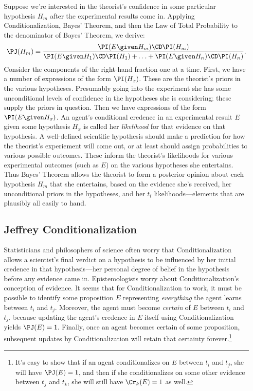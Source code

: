 Suppose we're interested in the theorist's confidence in some particular hypothesis $H_m$ after the experimental results come in. Applying Conditionalization, Bayes' Theorem, and then the Law of Total Probability to the denominator of Bayes' Theorem, we derive:
\begin{equation}
\PJ(H_m)=\frac{\PI(E \given H_m) \CD \PI(H_m)}{\PI(E \given H_1) \CD \PI(H_1) + \ldots + \PI(E \given H_n) \CD \PI(H_n)}.
\end{equation}
Consider the components of the right-hand fraction one at a time. First, we have a number of expressions of the form $\PI(H_x)$. These are the theorist's priors in the various hypotheses. Presumably going into the experiment she has some unconditional levels of confidence in the hypotheses she is considering; these supply the priors in question. Then we have expressions of the form $\PI(E \given H_x)$. An agent's conditional credence in an experimental result $E$ given some hypothesis $H_x$ is called her \textit{likelihood} for that evidence on that hypothesis. A well-defined scientific hypothesis should make a prediction for how the theorist's experiement will come out, or at least should assign probabilities to various possible outcomes. These inform the theorist's likelihoods for various experimental outcomes (such as $E$) on the various hypotheses she entertains. Thus Bayes' Theorem allows the theorist to form a posterior opinion about each hypothesis $H_m$ that she entertains, based on the evidence she's received, her unconditional priors in the hypotheses, and her $t_i$ likelihoods---elements that are plausibly all easily to hand.


\subsection{Jeffrey Conditionalization}  \label{ss:Jeff}
Statisticians and philosophers of science often worry that Conditionalization allows a scientist's final verdict on a hypothesis to be influenced by her initial credence in that hypothesis---her personal degree of belief in the hypothesis before any evidence came in. Epistemologists worry about Conditionalization's conception of evidence. It seems that for Conditionalization to work, it must be possible to identify some proposition $E$ representing \emph{everything} the agent learns between $t_i$ and $t_j$. Moreover, the agent must become \emph{certain} of $E$ between $t_i$ and $t_j$, because updating the agent's credence in $E$ itself using Conditionalization yields $\PJ(E)=1$. Finally, once an agent becomes certain of some proposition, subsequent updates by Conditionalization will retain that certainty forever.\footnote
{It's easy to show that if an agent conditionalizes on $E$ between $t_i$ and $t_j$, she will have $\PJ(E)=1$, and then if she conditionalizes on some other evidence between $t_j$ and $t_k$, she will still have $\Cr_k(E)=1$ as well.}


